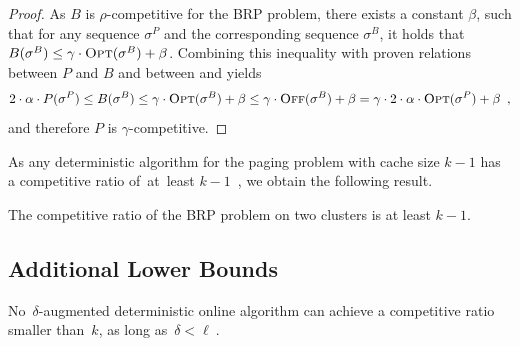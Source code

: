 \begin{proof}
As $B$ is $\rho$-competitive for the BRP problem, there exists a constant
$\beta$, such that for any sequence $\sigma^P$ and the corresponding sequence
$\sigma^B$, it holds that $B(\sigma^B) \leq \gamma \cdot \textsc{Opt}(\sigma^B) +
\beta$. Combining this inequality with proven relations between $P$ and $B$
and between \OFF and \OPT yields
\[
	2 \cdot \alpha \cdot P(\sigma^P) \leq 
	B(\sigma^B) \leq \gamma \cdot \textsc{Opt}(\sigma^B) + \beta
	\leq \gamma \cdot \textsc{Off}(\sigma^B) + \beta
	 =\gamma \cdot 2 \cdot \alpha \cdot \textsc{Opt}(\sigma^P) + \beta
	\enspace,
\]
and therefore $P$ is $\gamma$-competitive.
\end{proof}

As any deterministic algorithm for the paging problem with cache size $k-1$
has a competitive ratio of~at~least $k-1$~\cite{SleTar85}, we obtain the
following result.

\begin{corollary}
The competitive ratio of the BRP problem on two clusters is at least $k-1$. 
\end{corollary}


\subsection{Additional Lower Bounds}
\label{sec:lower-bounds}

\begin{theorem}\label{thm:loweraugmk}
No~$\delta$-augmented deterministic online algorithm \ONL
can achieve a competitive ratio smaller than~$k$, as long as~$\delta < \ell~$.
\end{theorem}

